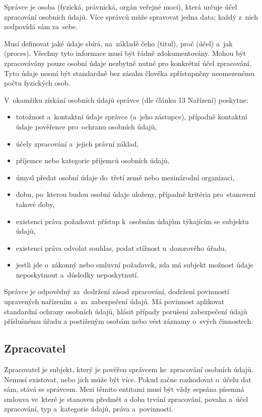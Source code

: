 Správce je osoba (fyzická, právnická, orgán veřejné moci), která určuje účel zpracování osobních údajů.
Více správců může spravovat jedna data; každý z~nich zodpovídá sám za~sebe.

Musí definovat jaké údaje sbírá, na~základě čeho (titul), proč (účel) a~jak (proces).
Všechny tyto informace musí být řádně zdokumentovány.
Mohou být zpracovávány pouze osobní údaje nezbytně nutné pro konkrétní účel zpracování.
Tyto údaje nesmí být standardně bez zásahu člověka zpřístupněny neomezenému počtu fyzických osob.

V~okamžiku získání osobních údajů správce (dle článku 13 Nařízení) poskytne:

\begin{itemize}
    \item totožnost a~kontaktní údaje správce (a~jeho zástupce), případně kontaktní údaje pověřence pro~ochranu osobních údajů,
    \item účely zpracování a~jejich právní základ,
    \item příjemce nebo kategorie příjemců osobních údajů,
    \item úmysl předat osobní údaje do~třetí země nebo mezinárodní organizaci,
    \item dobu, po~kterou budou osobní údaje uloženy, případně kritéria pro~stanovení takové doby,
    \item existenci práva požadovat přístup k~osobním údajům týkajícím se subjektu údajů,
    \item existenci práva odvolat souhlas, podat stížnost u~dozorového úřadu,
    \item jestli jde o~zákonný nebo smluvní požadavek, zda má subjekt možnost údaje neposkytnout a~důsledky neposkytnutí.
\end{itemize}

Správce je odpovědný za~dodržení zásad zpracování, dodržení povinností upravených nařízením a~za~zabezpečení údajů.
Má povinnost aplikovat standardní ochrany osobních údajů, hlásit případy porušení zabezpečení údajů příslušnému úřadu a postiženým osobám nebo vést záznamy o~svých činnostech.


\subsection{Zpracovatel}

Zpracovatel je subjekt, který je pověřen správcem ke~zpracování osobních údajů.
Nemusí existovat, nebo jich může být více.
Pokud začne rozhodovat o~účelu dat sám, stává se správcem.
Mezi těmito entitami musí být vždy sepsána písemná smlouva ve~které je stanoven předmět a doba trvání zpracování, povaha a~účel zpracování, typ a~kategorie údajů, práva a~povinnosti.


